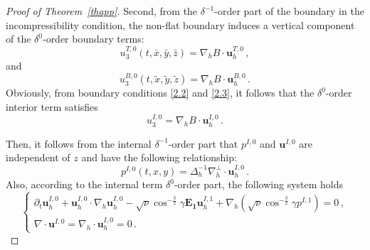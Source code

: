 \documentclass[pdflatex,sn-mathphys-num]{sn-jnl}%
\theoremstyle{thmstyleone}%
\theoremstyle{thmstyletwo}%
\theoremstyle{thmstylethree}%
\theoremstyle{thmstyletwo}
\begin{document}
\begin{proof}[Proof of Theorem~{\upshape\ref{thapp}}]
Second, from the $\delta^{-1}$-order part of the boundary in the incompressibility condition, the non-flat boundary induces a vertical component of the $\delta^{0}$-order boundary terms:
\begin{equation}\label{2.11}
	u_3^{T,0}(t,\bar{x},\bar{y},\bar{z})=\nabla_hB\cdot\boldsymbol u_h^{T,0}\,,
\end{equation} 
and
\begin{equation}\label{2.12}
	u_3^{B,0}(t,\tilde{x},\tilde{y},\tilde{z})=\nabla_hB\cdot\boldsymbol u_h^{B,0}\,.
\end{equation}
Obviously, from boundary conditions \eqref{2.2} and \eqref{2.3}, it follows that the $\delta^{0}$-order interior term satisfies
\begin{equation}\label{2.13}
	u_3^{I,0}=\nabla_hB\cdot\boldsymbol u_h^{I,0}\,.
\end{equation}



Then, it follows from the internal $\delta^{-1}$-order part that $p^{I,0}$ and $\boldsymbol{u}^{I,0}$ are independent of $z$ and have the following relationship:
\begin{equation}\label{2.14}
	p^{I,0}(t,x,y)=\Delta_h^{-1}\nabla^\perp_h \cdot \boldsymbol{u}^{I,0}_h\,.
\end{equation}
Also, according to the internal term $\delta^{0}$-order part, the following system holds		
\begin{equation*}
	\begin{cases}
		\partial_{t} \boldsymbol{u}^{I,0}_h+\boldsymbol{u}^{I,0}_h \cdot \nabla_h \boldsymbol{u}^{I,0}_h
		-\sqrt{\nu}\cos^{-\frac32}\gamma
		\boldsymbol{E_1}\boldsymbol{u}^{I,1}_h
		+\nabla_h(\sqrt{\nu}\cos^{-\frac32}\gamma
		{p}^{I,1})=0\,,\\
		\nabla\cdot \boldsymbol{u}^{I,0}=\nabla_h \cdot \boldsymbol{u}^{I,0}_h=0\,.
	\end{cases}
\end{equation*}		



\end{proof}
\end{document}
